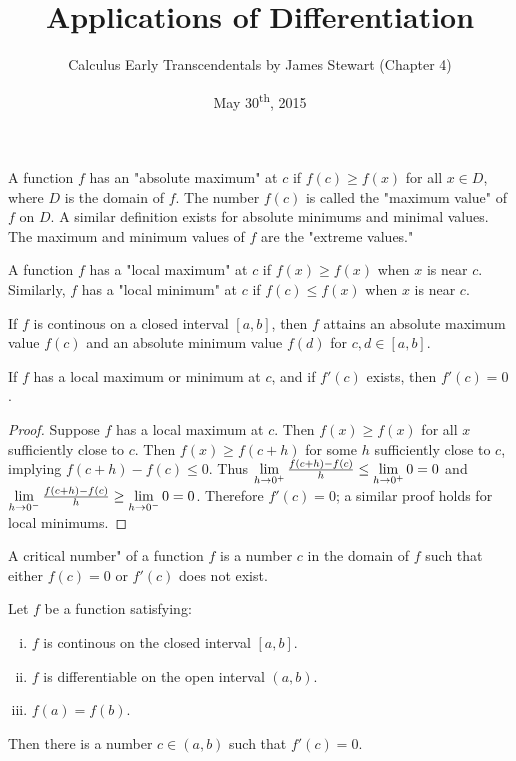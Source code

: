 \documentclass[a4paper,11pt]{article}
\title{Applications of Differentiation}
\author{Calculus Early Transcendentals by James Stewart (Chapter 4)}
\date{May 30\textsuperscript{th}, 2015}
\begin{document}
\maketitle
{}

\begin{outline}

    A function \(f\) has an "absolute maximum" at \(c\) if \(f(c) \geq f(x)\) for all \(x \in D\), where \(D\) is the
    domain of \(f\). The number \(f(c)\) is called the "maximum value" of \(f\) on \(D\). A similar definition exists
    for absolute minimums and minimal values. The maximum and minimum values of \(f\) are the "extreme values."
    
    A function \(f\) has a "local maximum" at \(c\) if \(f(x) \geq f(x)\) when \(x\) is near \(c\). Similarly, \(f\)
    has a "local minimum" at \(c\) if \(f(c) \leq f(x)\) when \(x\) is near \(c\).
    
    If \(f\) is continous on a closed interval \([a, b]\), then \(f\) attains an absolute maximum value \(f(c)\) and
    an absolute minimum value \(f(d)\) for \(c,d \in [a, b]\).
    
    If \(f\) has a local maximum or minimum at \(c\), and if \(f'(c)\) exists, then \(f'(c) = 0\).
    
    \begin{proof}
      Suppose \(f\) has a local maximum at \(c\). Then \(f(x) \geq f(x)\) for all \(x\) sufficiently close to \(c\).
      Then \(f(x)\geq f(c+h)\) for some \(h\) sufficiently close to \(c\), implying \(f(c+h)-f(c)\leq 0\). Thus
      \(\xlimit[+]{h}{0} \frac{f(c+h)-f(c)}{h} \leq \xlimit[+]{h}{0} 0 = 0\) and \(\xlimit[-]{h}{0} \frac{f(c+h)-f(c)}
      {h} \geq \xlimit[-]{h}{0} 0 = 0\). Therefore \(f'(c)=0\); a similar proof holds for local minimums.
    \end{proof}
    
    A critical number" of a function \(f\) is a number \(c\) in the domain of \(f\) such that either \(f(c)=0\)
    or \(f'(c)\) does not exist.
    
    Let \(f\) be a function satisfying:
    \begin{enumerate}[i.]
      \item \(f\) is continous on the closed interval \([a, b]\).
      \item \(f\) is differentiable on the open interval \((a, b)\).
      \item \(f(a) = f(b)\).
    \end{enumerate}
    Then there is a number \(c \in (a, b)\) such that \(f'(c) = 0\).


\end{outline}
\end{document}
